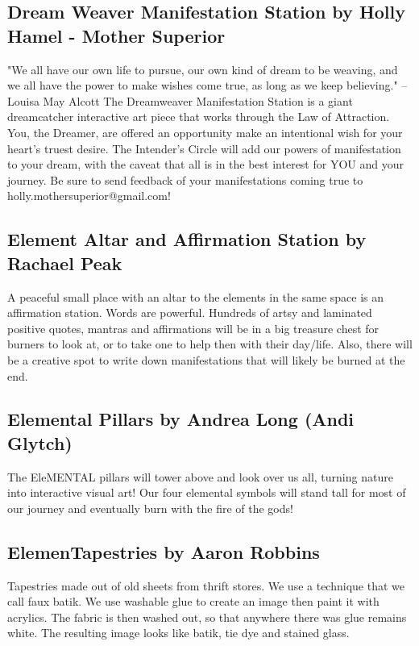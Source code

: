 \begin{multicols}{2}
\subsection*{Dream Weaver Manifestation Station by Holly Hamel - Mother Superior        }
"We all have our own life to pursue, our own kind of dream to be weaving, and we all have the power to make wishes come true, as long as we keep believing."   -- Louisa May Alcott      
The Dreamweaver Manifestation Station is a giant dreamcatcher interactive art piece that works through the Law of Attraction. You, the Dreamer, are offered an opportunity make an intentional wish for your heart’s truest desire. The Intender’s Circle will add our powers of manifestation to your dream, with the caveat that all is in the best interest for YOU and your journey. Be sure to send feedback of your manifestations coming true to holly.mothersuperior@gmail.com!


\subsection*{Element Altar and Affirmation Station by Rachael Peak                 }
A peaceful small place with an altar to the elements in the same space is an affirmation station. Words are powerful. Hundreds of artsy and laminated positive quotes, mantras and affirmations will be in a big treasure chest for burners to look at, or to take one to help then with their day/life. Also, there will be a creative spot to write down manifestations that will likely be burned at the end.


\subsection*{Elemental Pillars        by Andrea Long (Andi Glytch)        }
The EleMENTAL pillars will tower above and look over us all, turning nature into interactive visual art! Our four elemental symbols will stand tall for most of our journey and eventually burn with the fire of the gods!        


\subsection*{ElemenTapestries by Aaron Robbins                }
Tapestries made out of old sheets from thrift stores. We use a technique that we call faux batik. We use washable glue to create an image then paint it with acrylics. The fabric is then washed out, so that anywhere there was glue remains white. The resulting image looks like batik, tie dye and stained glass.



\end{multicols}
